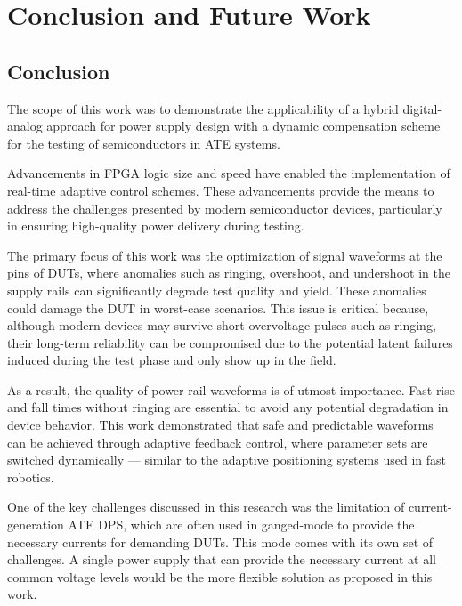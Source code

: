 

\section{Conclusion and Future Work}
\label{sec:conclusion-and-future-work}

\subsection{Conclusion}

The scope of this work was to demonstrate the applicability of a hybrid
digital-analog approach for power supply design with a dynamic compensation
scheme for the testing of semiconductors in \acs{ATE} systems.

Advancements in FPGA logic size and speed have enabled the implementation of
real-time adaptive control schemes.
These advancements provide the means to address the challenges presented by
modern semiconductor devices, particularly in ensuring high-quality power
delivery during testing.

The primary focus of this work was the optimization of signal waveforms at
the pins of \acs{DUT}s, where anomalies such as ringing, overshoot, and
undershoot in the supply rails can significantly degrade test quality and yield.
These anomalies could damage the \acs{DUT} in worst-case scenarios.
This issue is critical because, although modern devices may survive short
overvoltage pulses such as ringing, their long-term reliability can be
compromised due to the potential latent failures induced during the test phase
and only show up in the field.

As a result, the quality of power rail waveforms is of utmost importance.
Fast rise and fall times without ringing are essential to avoid any
potential degradation in device behavior.
This work demonstrated that safe and predictable waveforms can be achieved
through adaptive feedback control, where parameter sets are switched dynamically
— similar to the adaptive positioning systems used in fast robotics.

One of the key challenges discussed in this research was the limitation
of current-generation \acs{ATE} \acs{DPS}, which are often used in
ganged-mode to provide the necessary currents for demanding \acs{DUT}s.
This mode comes with its own set of challenges.
A single power supply that can provide the necessary current at all common
voltage levels would be the more flexible solution as proposed in this work.

